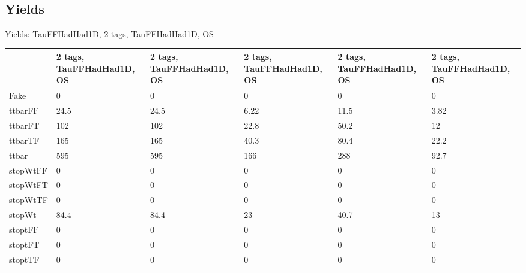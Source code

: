
\subsection{Yields}

\begin{frame}{Yields: TauFFHadHad1D, 2 tags, TauFFHadHad1D, OS}
\begin{center}
  \begin{tabular}{l| >{\centering\let\newline\\\arraybackslash\hspace{0pt}}m{1.4cm}| >{\centering\let\newline\\\arraybackslash\hspace{0pt}}m{1.4cm}| >{\centering\let\newline\\\arraybackslash\hspace{0pt}}m{1.4cm}| >{\centering\let\newline\\\arraybackslash\hspace{0pt}}m{1.4cm}| >{\centering\let\newline\\\arraybackslash\hspace{0pt}}m{1.4cm}}
    & 2 tags, TauFFHadHad1D, OS & 2 tags, TauFFHadHad1D, OS & 2 tags, TauFFHadHad1D, OS & 2 tags, TauFFHadHad1D, OS & 2 tags, TauFFHadHad1D, OS \\
 \hline \hline
    Fake& 0 & 0 & 0 & 0 & 0 \\
 \hline
    ttbarFF& 24.5 & 24.5 & 6.22 & 11.5 & 3.82 \\
 \hline
    ttbarFT& 102 & 102 & 22.8 & 50.2 & 12 \\
 \hline
    ttbarTF& 165 & 165 & 40.3 & 80.4 & 22.2 \\
 \hline
    ttbar& 595 & 595 & 166 & 288 & 92.7 \\
 \hline
    stopWtFF& 0 & 0 & 0 & 0 & 0 \\
 \hline
    stopWtFT& 0 & 0 & 0 & 0 & 0 \\
 \hline
    stopWtTF& 0 & 0 & 0 & 0 & 0 \\
 \hline
    stopWt& 84.4 & 84.4 & 23 & 40.7 & 13 \\
 \hline
    stoptFF& 0 & 0 & 0 & 0 & 0 \\
 \hline
    stoptFT& 0 & 0 & 0 & 0 & 0 \\
 \hline
    stoptTF& 0 & 0 & 0 & 0 & 0 \\
 \hline

\end{tabular}
\end{center}
\end{frame}
